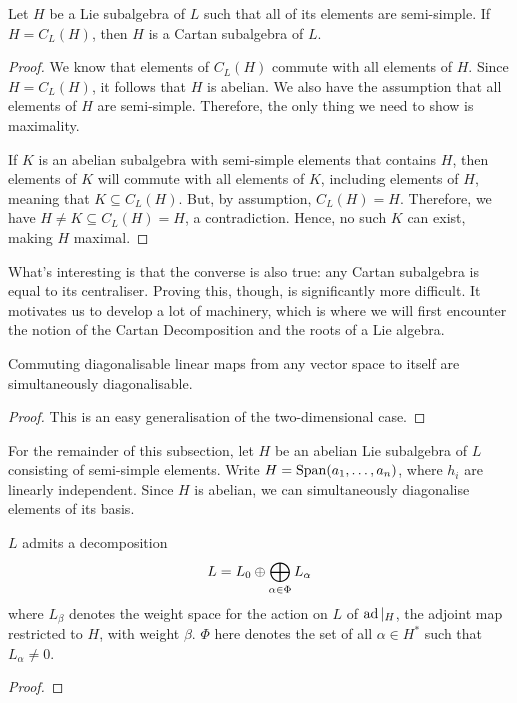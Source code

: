 \begin{lemma}\label{Ch3:Lemma:Eq_Centraliser_Implies_Cartan}
    Let $H$ be a Lie subalgebra of $L$ such that all of its elements are semi-simple. If $H = C_L(H)$, then $H$ is a Cartan subalgebra of $L$.
\end{lemma}
\begin{proof}
    We know that elements of $C_L(H)$ commute with all elements of $H$. Since $H = C_L(H)$, it follows that $H$ is abelian. We also have the assumption that all elements of $H$ are semi-simple. Therefore, the only thing we need to show is maximality.
    
    If $K$ is an abelian subalgebra with semi-simple elements that contains $H$, then elements of $K$ will commute with all elements of $K$, including elements of $H$, meaning that $K \subseteq C_L(H)$. But, by assumption, $C_L(H) = H$. Therefore, we have $H \neq K \subseteq C_L(H) = H$, a contradiction. Hence, no such $K$ can exist, making $H$ maximal.
\end{proof}

What's interesting is that the converse is also true: any Cartan subalgebra is equal to its centraliser. Proving this, though, is significantly more difficult. It motivates us to develop a lot of machinery, which is where we will first encounter the notion of the Cartan Decomposition and the roots of a Lie algebra.

\begin{lemma}
    Commuting diagonalisable linear maps from any vector space to itself are simultaneously diagonalisable.
\end{lemma}
\begin{proof}
    This is an easy generalisation of the two-dimensional case. \sorry %
\end{proof}

For the remainder of this subsection, let $H$ be an abelian Lie subalgebra of $L$ consisting of semi-simple elements. Write $H = \operatorname{Span}\!\left( a_1, \ldots, a_n \right)$, where $h_i$ are linearly independent. Since $H$ is abelian, we can simultaneously diagonalise elements of its basis.

\begin{boxproposition}\label{Ch3:Prop:CartanDecompExists}
    $L$ admits a decomposition
    \begin{align}
        L = L_0 \oplus \bigoplus_{\alpha \in \Phi} L_{\alpha}
        \label{Ch3:Eq:CartanDecomp}
    \end{align}
    where $L_\beta$ denotes the weight space for the action on $L$ of $\operatorname{ad}\vert_{H}$, the adjoint map restricted to $H$, with weight $\beta$. $\Phi$ here denotes the set of all $\alpha \in H^*$ such that $L_{\alpha} \neq 0$.
\end{boxproposition}
\begin{proof}
    \sorry
\end{proof}

